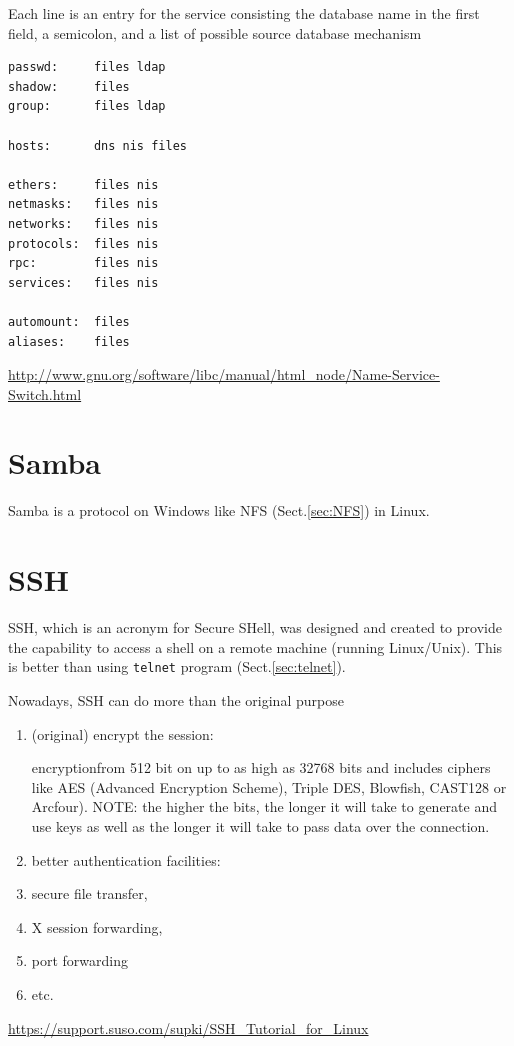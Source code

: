 Each line is an entry for the service consisting the
database name in the first field, a semicolon, and a list of possible source
database mechanism 
\begin{verbatim}
passwd:     files ldap
shadow:     files
group:      files ldap

hosts:      dns nis files

ethers:     files nis
netmasks:   files nis
networks:   files nis
protocols:  files nis
rpc:        files nis
services:   files nis

automount:  files
aliases:    files
\end{verbatim}



\url{http://www.gnu.org/software/libc/manual/html_node/Name-Service-Switch.html} 


\section{Samba}
\label{sec:Samba}

Samba is a protocol on Windows like NFS (Sect.\ref{sec:NFS}) in Linux. 

\section{SSH}
\label{sec:SSH}
\label{sec:ssh}

SSH, which is an acronym for Secure SHell, was designed and created to provide
the capability to access a shell on a remote machine (running Linux/Unix). This
is better than using \verb!telnet! program (Sect.\ref{sec:telnet}).

Nowadays, SSH can do more than the original purpose
\begin{enumerate}
  \item (original) encrypt the session:
  
  encryptionfrom 512 bit on up to as high as 32768 bits and includes ciphers
  like AES (Advanced Encryption Scheme), Triple DES, Blowfish, CAST128 or
  Arcfour). NOTE: the higher the bits, the longer it will take to generate and
  use keys as well as the longer it will take to pass data over the connection. 
  
  \item better authentication facilities:
   
  \item secure file transfer, 
  \item X session forwarding, 
  \item port forwarding
  \item etc.
\end{enumerate}
\url{https://support.suso.com/supki/SSH_Tutorial_for_Linux}

